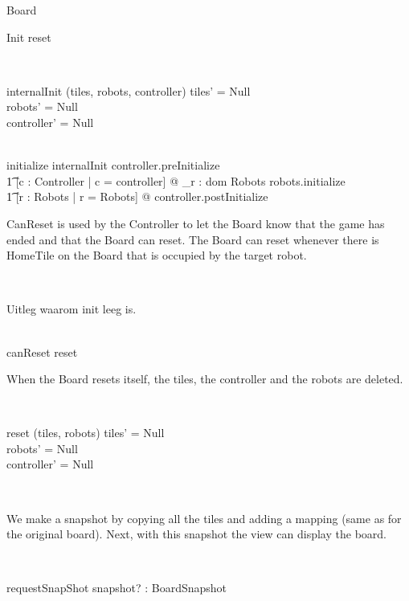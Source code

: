 \documentclass[12pt]{article}
\begin{document}
\begin{class}{Board}
\begin{schema}{Init}
reset
\end{schema} \\
\begin{schema}{internalInit}
\Delta (tiles, robots, controller)
\where
tiles' \not = Null \\
robots' \not = Null \\
controller' \not = Null
\end{schema} \\
initialize \sdef internalInit \comp controller.preInitialize \; \comp \\ \t1 
[c : Controller | c = controller] @ \bigwedge_{r : dom Robots} robots.initialize \; \comp \\ \t1
[r : \power Robots | r = \dom Robots] @ controller.postInitialize \\
\znewpage
\begin{classcom}
CanReset is used by the Controller to let the Board know that the game has ended and that the Board can reset. The Board can reset whenever there is HomeTile on the Board that is occupied by the target robot.
\end{classcom} \\
\begin{classcom}
Uitleg waarom init leeg is.
\end{classcom} \\
canReset \sdef [\exists t : \ran tiles | t \in HomeTileTiles @ \\
\t1 t.target = t.occupier] \wedge reset \\
\begin{classcom}
When the Board resets itself, the tiles, the controller and the robots are deleted.
\end{classcom} \\
\begin{schema}{reset}
\Delta (tiles, robots)
\where
tiles' = Null \\
robots' = Null \\
controller' = Null
\end{schema} \\
\begin{classcom}
We make a snapshot by copying all the tiles and adding a mapping (same as for the original board). Next, with this snapshot the view can display the board.
\end{classcom} \\
\begin{schema}{requestSnapShot}
snapshot? : BoardSnapshot
\where

\end{schema}
\end{class}
\end{document}
